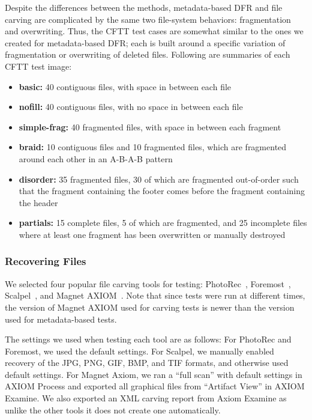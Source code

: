 Despite the differences between the methods, metadata-based DFR and file carving are complicated by the same two file-system behaviors: fragmentation and overwriting. Thus, the CFTT test cases are somewhat similar to the ones we created for metadata-based DFR; each is built around a specific variation of fragmentation or overwriting of deleted files.
Following are summaries of each CFTT test image:
\begin{itemize}
 \item \textbf{basic:} 40 contiguous files, with space in between each file
 \item \textbf{nofill:} 40 contiguous files, with no space in between each file
 \item \textbf{simple-frag:} 40 fragmented files, with space in between each fragment
 \item \textbf{braid:} 10 contiguous files and 10 fragmented files, which are fragmented around each other in an A-B-A-B pattern
 \item \textbf{disorder:} 35 fragmented files, 30 of which are fragmented out-of-order such that the fragment containing the footer comes before the fragment containing the header
 \item \textbf{partials:} 15 complete files, 5 of which are fragmented, and 25 incomplete files where at least one fragment has been overwritten or manually destroyed

\end{itemize}


\subsubsection{Recovering Files}

We selected four popular file carving tools for testing: PhotoRec~\cite{photorec}, Foremost~\cite{foremost}, Scalpel~\cite{scalpel}, and Magnet AXIOM~\cite{axiom_carve}.
Note that since tests were run at different times, the version of Magnet AXIOM used for carving tests is newer than the version used for metadata-based tests.

The settings we used when testing each tool are as follows:
For PhotoRec and Foremost, we used the default settings.
For Scalpel, we manually enabled recovery of the JPG, PNG, GIF, BMP, and TIF formats, and otherwise used default settings.
For Magnet Axiom, we ran a ``full scan'' with default settings in AXIOM Process and exported all graphical files from ``Artifact View'' in AXIOM Examine.
We also exported an XML carving report from Axiom Examine as unlike the other tools it does not create one automatically.

